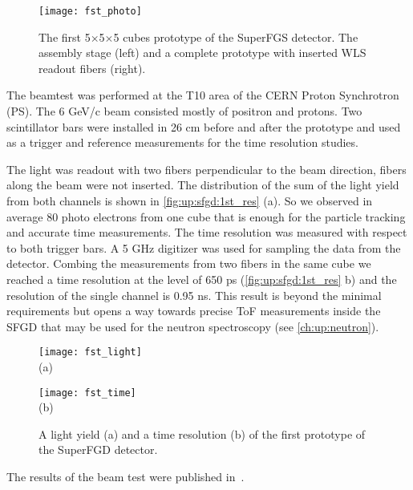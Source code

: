 \documentclass[main.tex]{subfiles}
\begin{document}
\begin{figure}[!ht]
	\centering
	\texttt{[image: fst\_photo]}
	\caption{The first 5$\times$5$\times$5 cubes prototype of the SuperFGS detector. The assembly stage (left) and a complete prototype with inserted WLS readout fibers (right).}
	\label{fig:up:sfgd:1st}
\end{figure}

The beamtest was performed at the T10 area of the CERN Proton Synchrotron (PS). The 6 GeV/c beam consisted mostly of positron and protons. Two scintillator bars were installed in 26 cm before and after the prototype and used as a trigger and reference measurements for the time resolution studies.

The light was readout with two fibers perpendicular to the beam direction, fibers along the beam were not inserted. The distribution of the sum of the light yield from both channels is shown in \autoref{fig:up:sfgd:1st_res} (a). So we observed in average 80 photo electrons from one cube that is enough for the particle tracking and accurate time measurements. The time resolution was measured with respect to both trigger bars. A 5 GHz digitizer was used for sampling the data from the detector. Combing the measurements from two fibers in the same cube we reached a time resolution at the level of 650 ps (\autoref{fig:up:sfgd:1st_res} b) and the resolution of the single channel is 0.95 ns. This result is beyond the minimal requirements but opens a way towards precise ToF measurements inside the SFGD that may be used for the neutron spectroscopy (see \autoref{ch:up:neutron}).

\begin{figure}[!ht]
	\centering
	\begin{minipage}{0.49\linewidth}
		\centering
		\texttt{[image: fst\_light]} \\ (a)
	\end{minipage}
	\begin{minipage}{0.49\linewidth}
		\centering
		\texttt{[image: fst\_time]} \\ (b)
	\end{minipage}
	\caption{A light yield (a) and a time resolution (b) of the first prototype of the SuperFGD detector.}
	\label{fig:up:sfgd:1st_res}
\end{figure}

The results of the beam test were published in~\cite{Mineev2019}.
\end{document}
